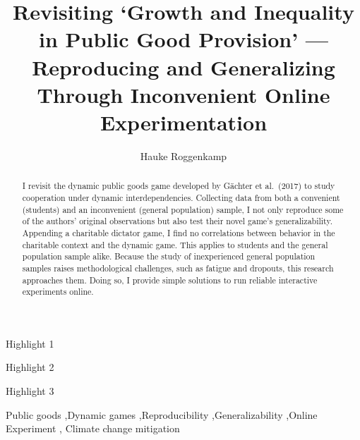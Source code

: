 \documentclass[
  authoryear,
  review,
  3p,
  onecolumn]{elsarticle}
\begin{document}
\begin{frontmatter}
\title{Revisiting `Growth and Inequality in Public Good Provision'
---Reproducing and Generalizing Through Inconvenient Online
Experimentation}
\author[1,2]{Hauke Roggenkamp%
%
}



        
\begin{abstract}
I revisit the dynamic public goods game developed by Gächter et
al.~(2017) to study cooperation under dynamic interdependencies.
Collecting data from both a convenient (students) and an inconvenient
(general population) sample, I not only reproduce some of the authors'
original observations but also test their novel game's generalizability.
Appending a charitable dictator game, I find no correlations between
behavior in the charitable context and the dynamic game. This applies to
students and the general population sample alike. Because the study of
inexperienced general population samples raises methodological
challenges, such as fatigue and dropouts, this research approaches them.
Doing so, I provide simple solutions to run reliable interactive
experiments online.
\end{abstract}



\begin{highlights}
\item Highlight 1\item Highlight 2\item Highlight 3
\end{highlights}


\begin{keyword}
    Public goods \sep Dynamic
games \sep Reproducibility \sep Generalizability \sep Online
Experiment \sep 
    Climate change mitigation
\end{keyword}
\end{frontmatter}\ifdefined\Shaded\renewenvironment{Shaded}{\begin{tcolorbox}[sharp corners, enhanced, breakable, borderline west={3pt}{0pt}{shadecolor}, frame hidden, interior hidden, boxrule=0pt]}{\end{tcolorbox}}\fi
\end{document}
